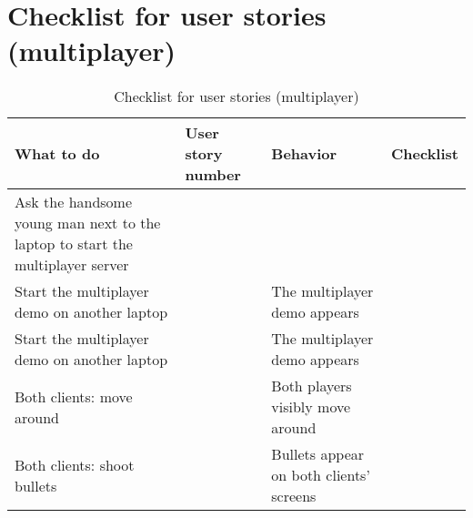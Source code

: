 \documentclass{article}
\begin{document}
\section{Checklist for user stories (multiplayer)}
\begin{table}[H]
    \centering
    \begin{tabular}{|p{3cm}|p{3cm}|p{6cm}|p{3cm}|}
    \hline
    \textbf{What to do} & \textbf{User story number} & \textbf{Behavior} & \textbf{Checklist} \\ \hline
    Ask the handsome young man next to the laptop to start the multiplayer server & & & \\ \hline
    Start the multiplayer demo on another laptop & & The multiplayer demo appears & \\ \hline
    Start the multiplayer demo on another laptop & & The multiplayer demo appears & \\ \hline
    Both clients: move around & & Both players visibly move around & \\ \hline
    Both clients: shoot bullets & & Bullets appear on both clients' screens & \\ \hline
    
    \end{tabular}
    \caption{Checklist for user stories (multiplayer)}
    \label{tab:user_stories}
    \end{table}
\end{document}
